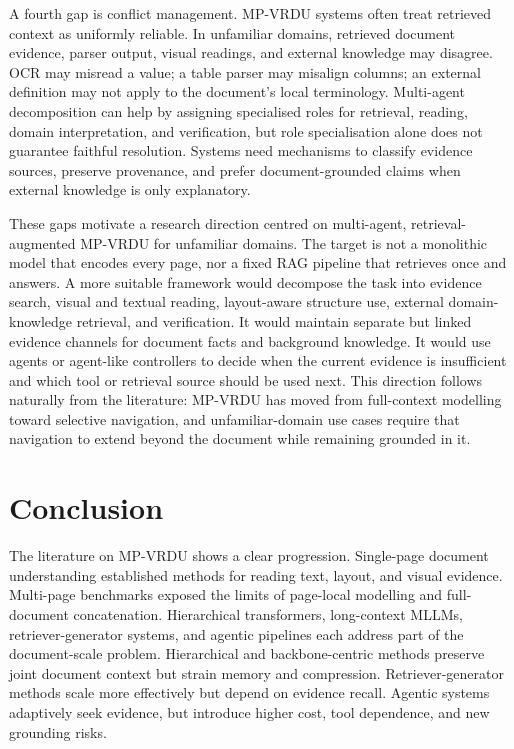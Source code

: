 \documentclass[10pt,a4paper]{article}
\begin{document}
A fourth gap is conflict management. MP-VRDU systems often treat retrieved context as uniformly reliable. In unfamiliar domains, retrieved document evidence, parser output, visual readings, and external knowledge may disagree. OCR may misread a value; a table parser may misalign columns; an external definition may not apply to the document's local terminology. Multi-agent decomposition can help by assigning specialised roles for retrieval, reading, domain interpretation, and verification, but role specialisation alone does not guarantee faithful resolution. Systems need mechanisms to classify evidence sources, preserve provenance, and prefer document-grounded claims when external knowledge is only explanatory.

These gaps motivate a research direction centred on multi-agent, retrieval-augmented MP-VRDU for unfamiliar domains. The target is not a monolithic model that encodes every page, nor a fixed RAG pipeline that retrieves once and answers. A more suitable framework would decompose the task into evidence search, visual and textual reading, layout-aware structure use, external domain-knowledge retrieval, and verification. It would maintain separate but linked evidence channels for document facts and background knowledge. It would use agents or agent-like controllers to decide when the current evidence is insufficient and which tool or retrieval source should be used next. This direction follows naturally from the literature: MP-VRDU has moved from full-context modelling toward selective navigation, and unfamiliar-domain use cases require that navigation to extend beyond the document while remaining grounded in it.

\section{Conclusion}

The literature on MP-VRDU shows a clear progression. Single-page document understanding established methods for reading text, layout, and visual evidence. Multi-page benchmarks exposed the limits of page-local modelling and full-document concatenation. Hierarchical transformers, long-context MLLMs, retriever-generator systems, and agentic pipelines each address part of the document-scale problem. Hierarchical and backbone-centric methods preserve joint document context but strain memory and compression. Retriever-generator methods scale more effectively but depend on evidence recall. Agentic systems adaptively seek evidence, but introduce higher cost, tool dependence, and new grounding risks.
\end{document}
